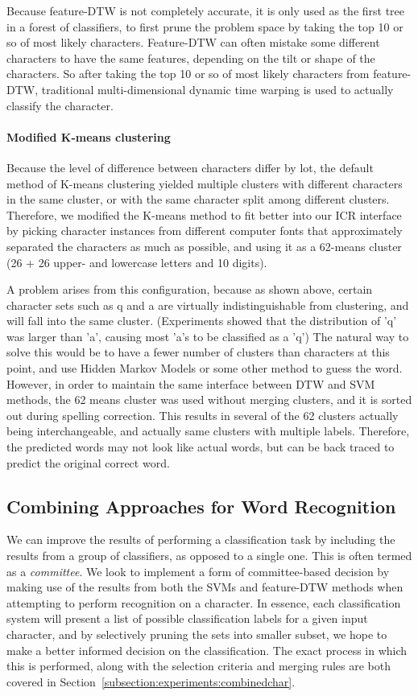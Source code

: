 \documentclass[12pt]{article}
\begin{document}
	Because feature-DTW is not completely accurate, it is only used as the first tree in a forest of classifiers, to first prune the problem space by taking the top 10 or so of most likely characters. Feature-DTW can often mistake some different characters to have the same features, depending on the tilt or shape of the characters. So after taking the top 10 or so of most likely characters from feature-DTW, traditional multi-dimensional dynamic time warping is used to actually classify the character.
	
	\paragraph {Modified K-means clustering} Because the level of difference between characters differ by lot, the default method of K-means clustering yielded multiple clusters with different characters in the same cluster, or with the same character split among different clusters. Therefore, we modified the K-means method to fit better into our ICR interface by picking character instances from different computer fonts that approximately separated the characters as much as possible, and using it as a 62-means cluster (26 + 26 upper- and lowercase letters and 10 digits).
	
	A problem arises from this configuration, because as shown above, certain character sets such as q and a are virtually indistinguishable from clustering, and will fall into the same cluster. (Experiments showed that the distribution of 'q' was larger than 'a', causing most 'a's to be classified as a 'q') The natural way to solve this would be to have a fewer number of clusters than characters at this point, and use Hidden Markov Models or some other method to guess the word. However, in order to maintain the same interface between DTW and SVM methods, the 62 means cluster was used without merging clusters, and it is sorted out during spelling correction. This results in several of the 62 clusters actually being interchangeable, and actually same clusters with multiple labels. Therefore, the predicted words may not look like actual words, but can be back traced to predict the original correct word.

	\subsection{Combining Approaches for Word Recognition}
	\label{subsection:combined}
	We can improve the results of performing a classification task by including the results from a group of classifiers, as opposed to a single one. This is often termed as a \textit{committee}. We look to implement a form of committee-based decision by making use of the results from both the SVMs and feature-DTW methods when attempting to perform recognition on a character. In essence, each classification system will present a list of possible classification labels for a given input character, and by selectively pruning the sets into smaller subset, we hope to make a better informed decision on the classification. The exact process in which this is performed, along with the selection criteria and merging rules are both covered in Section~\ref{subsection:experiments:combinedchar}.
\end{document}
